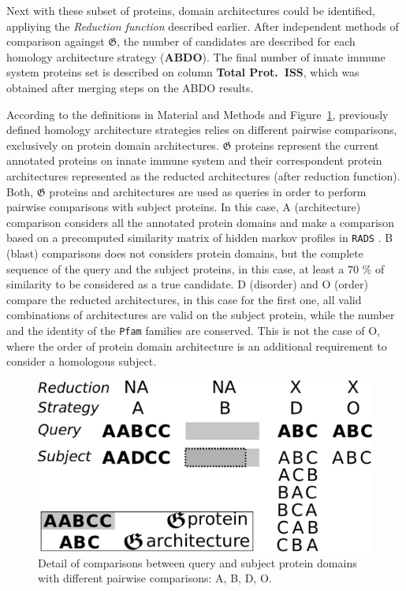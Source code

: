 \documentclass[11pt]{article}
\newcommand{\TODO}[1]{\begingroup\color{red}#1\endgroup}
\begin{document}
Next with these subset of proteins, domain architectures could be identified, appliying 
the \textsl{Reduction function} described earlier. After independent methods of comparison 
againgst $\boldsymbol{\mathfrak{G}}$, the number of candidates are described for 
each homology architecture strategy (\textbf{ABDO}). The final number of innate 
immune system proteins set is described on column \textbf{Total Prot.\ ISS}, which was 
obtained after merging steps on the ABDO results.

According to the definitions in Material and Methods and Figure~\ref{fig:ABDO}, 
previously defined homology architecture strategies relies on different pairwise 
comparisons, exclusively on protein domain architectures. $\boldsymbol{\mathfrak{G}}$
proteins represent the current annotated proteins on innate immune system and 
their correspondent protein architectures represented as the reducted architectures
(after reduction function). Both, $\boldsymbol{\mathfrak{G}}$ proteins and 
architectures are used as queries in order to perform pairwise comparisons with
subject proteins. In this case, A (architecture) comparison considers all the
annotated protein domains and make a comparison based on a precomputed 
similarity matrix of \TODO{hidden markov profiles} in \texttt{RADS} \cite{Terrapon:2014}.   
B (blast) comparisons does not considers protein domains, but the complete sequence
of the query and the subject proteins, in this case, at least a $70$ \% of similarity 
to be considered as a true candidate. D (disorder) and O (order) compare the 
reducted architectures, in this case for the first one, all valid combinations of 
architectures are valid on the subject protein, while the number and the identity of
the \texttt{Pfam} families are conserved. This is not the case of O, where the order
of protein domain architecture is an additional requirement to consider a homologous
subject. 

\begin{figure}[ht!]
\centering
\includegraphics[scale=0.3]{figures/ABDO}%
\caption{Detail of comparisons between query and subject protein domains with 
	different pairwise comparisons: A, B, D, O.}
\label{fig:ABDO}
\end{figure}
\end{document}
